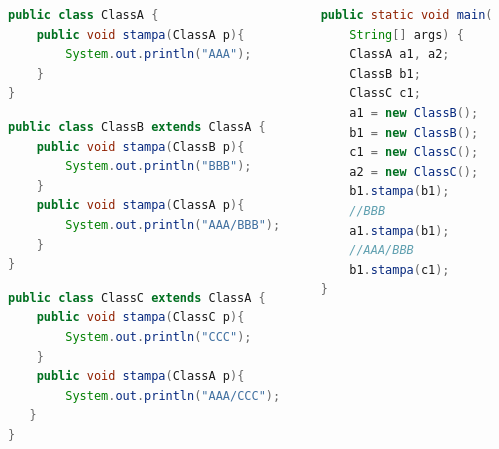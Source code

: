 \documentclass{beamer}
\begin{document}
\begin{frame}[fragile]
\begin{columns}
\begin{column}{0.6\textwidth}
\begin{lstlisting}[language=Java,escapechar=|]
public class ClassA {
    public void stampa(ClassA p){
        System.out.println("AAA");
    }
}
\end{lstlisting}
\begin{lstlisting}[language=Java,escapechar=|]
public class ClassB extends ClassA {
    public void stampa(ClassB p){
        System.out.println("BBB");
    }
    public void stampa(ClassA p){
        System.out.println("AAA/BBB");
    }
}
\end{lstlisting}
\begin{lstlisting}[language=Java,escapechar=|]
public class ClassC extends ClassA {
    public void stampa(ClassC p){
        System.out.println("CCC");
    }
    public void stampa(ClassA p){
        System.out.println("AAA/CCC");
   }
}
\end{lstlisting}
\end{column}
\begin{column}{0.4\textwidth}
\begin{lstlisting}[language=Java,escapechar=|]
public static void main(
    String[] args) {
    ClassA a1, a2;
    ClassB b1;
    ClassC c1;
    a1 = new ClassB();
    b1 = new ClassB();
    c1 = new ClassC();
    a2 = new ClassC();
    b1.stampa(b1); 
    //BBB
    a1.stampa(b1);  
    //AAA/BBB
    b1.stampa(c1);
}
\end{lstlisting}
\end{column}
\end{columns}
\end{frame}
\end{document}
